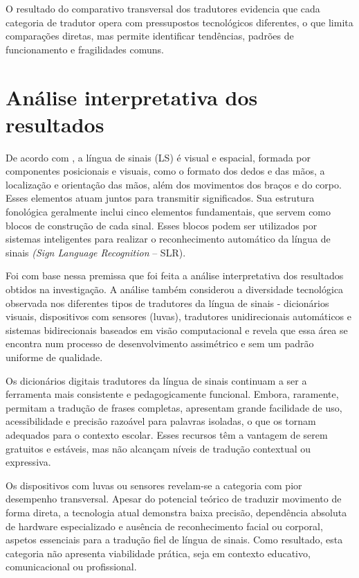 \documentclass[portuguese]{textolivre}
\begin{document}
O resultado do comparativo transversal dos tradutores evidencia que cada categoria de tradutor opera com pressupostos tecnológicos diferentes, o que limita comparações diretas, mas permite identificar tendências, padrões de funcionamento e fragilidades comuns.

\section{Análise interpretativa dos resultados}
De acordo com \textcite{Ahmed2018}, a língua de sinais (LS) é visual e espacial, formada por componentes posicionais e visuais, como o formato dos dedos e das mãos, a localização e orientação das mãos, além dos movimentos dos braços e do corpo. Esses elementos atuam juntos para transmitir significados. Sua estrutura fonológica geralmente inclui cinco elementos fundamentais, que servem como blocos de construção de cada sinal. Esses blocos podem ser utilizados por sistemas inteligentes para realizar o reconhecimento automático da língua de sinais \textit{(Sign Language Recognition} – SLR).

Foi com base nessa premissa que foi feita a análise interpretativa dos resultados obtidos na investigação. A análise também considerou a diversidade tecnológica observada nos diferentes tipos de tradutores da língua de sinais - dicionários visuais, dispositivos com sensores (luvas), tradutores unidirecionais automáticos e sistemas bidirecionais baseados em visão computacional e revela que essa área se encontra num processo de desenvolvimento assimétrico e sem um padrão uniforme de qualidade.

Os dicionários digitais tradutores da língua de sinais continuam a ser a ferramenta mais consistente e pedagogicamente funcional. Embora, raramente, permitam a tradução de frases completas, apresentam grande facilidade de uso, acessibilidade e precisão razoável para palavras isoladas, o que os tornam adequados para o contexto escolar. Esses recursos têm a vantagem de serem gratuitos e estáveis, mas não alcançam níveis de tradução contextual ou expressiva.

Os dispositivos com luvas ou sensores revelam-se a categoria com pior desempenho transversal. Apesar do potencial teórico de traduzir movimento de forma direta, a tecnologia atual demonstra baixa precisão, dependência absoluta de hardware especializado e ausência de reconhecimento facial ou corporal, aspetos essenciais para a tradução fiel de língua de sinais. Como resultado, esta categoria não apresenta viabilidade prática, seja em contexto educativo, comunicacional ou profissional.
\end{document}
